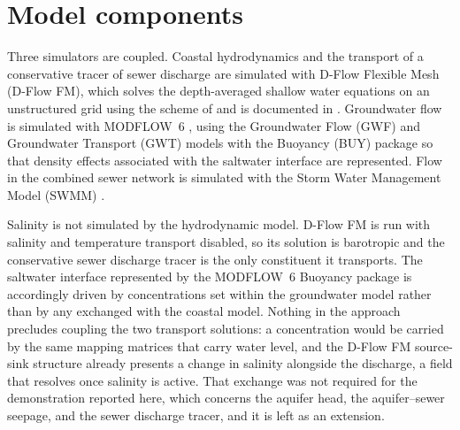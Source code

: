 \documentclass[preprint,authoryear,11pt]{elsarticle}
\begin{document}
\section{Model components}

Three simulators are coupled. Coastal hydrodynamics and the transport of a conservative tracer of sewer discharge are simulated with D-Flow Flexible Mesh (D-Flow FM), which solves the depth-averaged shallow water equations on an unstructured grid using the scheme of \cite{kernkamp2011unstructured} and is documented in \cite{deltares2026dflowfm}. Groundwater flow is simulated with MODFLOW~6 \citep{langevin2017modflow6}, using the Groundwater Flow (GWF) and Groundwater Transport (GWT) models with the Buoyancy (BUY) package so that density effects associated with the saltwater interface are represented. Flow in the combined sewer network is simulated with the Storm Water Management Model (SWMM) \citep{rossman2022swmm}.

Salinity is not simulated by the hydrodynamic model. D-Flow FM is run with salinity and temperature transport disabled, so its solution is barotropic and the conservative sewer discharge tracer is the only constituent it transports. The saltwater interface represented by the MODFLOW~6 Buoyancy package is accordingly driven by concentrations set within the groundwater model rather than by any exchanged with the coastal model. Nothing in the approach precludes coupling the two transport solutions: a concentration would be carried by the same mapping matrices that carry water level, and the D-Flow FM source-sink structure already presents a change in salinity alongside the discharge, a field that resolves once salinity is active. That exchange was not required for the demonstration reported here, which concerns the aquifer head, the aquifer--sewer seepage, and the sewer discharge tracer, and it is left as an extension.
\end{document}
